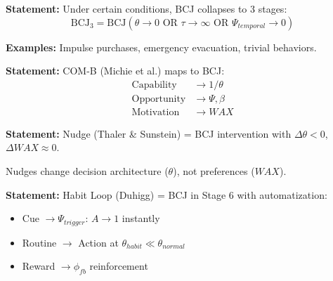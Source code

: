 \begin{tcolorbox}[colback=green!5!white, colframe=green!75!black,
    title=Theorem BCJ-T7: 3-Stage Collapse]
\textbf{Statement:} Under certain conditions, BCJ collapses to 3 stages:
\begin{equation}
\text{BCJ}_3 = \text{BCJ}(\theta \to 0 \text{ OR } \tau \to \infty \text{ OR } \Psi_{temporal} \to 0)
\end{equation}

\textbf{Examples:} Impulse purchases, emergency evacuation, trivial behaviors.
\end{tcolorbox}

\begin{tcolorbox}[colback=green!5!white, colframe=green!75!black,
    title=Theorem BCJ-T9: COM-B as Special Case]
\textbf{Statement:} COM-B (Michie et al.) maps to BCJ:
\begin{align}
\text{Capability} &\to 1/\theta \\
\text{Opportunity} &\to \Psi, \beta \\
\text{Motivation} &\to WAX
\end{align}
\end{tcolorbox}

\begin{tcolorbox}[colback=green!5!white, colframe=green!75!black,
    title=Theorem BCJ-T10: Nudge Theory as Special Case]
\textbf{Statement:} Nudge (Thaler \& Sunstein) = BCJ intervention with $\Delta\theta < 0$, $\Delta WAX \approx 0$.

Nudges change decision architecture ($\theta$), not preferences ($WAX$).
\end{tcolorbox}

\begin{tcolorbox}[colback=green!5!white, colframe=green!75!black,
    title=Theorem BCJ-T11: Habit Loop as Special Case]
\textbf{Statement:} Habit Loop (Duhigg) = BCJ in Stage 6 with automatization:
\begin{itemize}[nosep]
\item Cue $\to \Psi_{trigger}$: $A \to 1$ instantly
\item Routine $\to$ Action at $\theta_{habit} \ll \theta_{normal}$
\item Reward $\to \phi_{fb}$ reinforcement
\end{itemize}
\end{tcolorbox}

